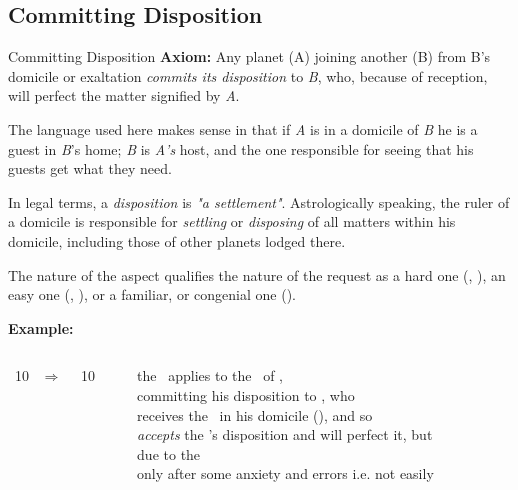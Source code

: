 \subsection{Committing Disposition}
\begin{frame}[t]{Committing Disposition}
\small
\textbf{Axiom:} Any planet (A) joining another (B) from B's domicile or exaltation \textsl{commits its disposition} to \textsl{B}, who, because of reception, will perfect the matter signified by \textsl{A}.

The language used here makes sense in that if \textsl{A} is in a domicile of \textsl{B} he is a guest in \textsl{B}'s home; \textsl{B} is \textsl{A's} host, and the one responsible for seeing that his guests get what they need.

In legal terms, a \textsl{disposition} is  \textsl{"a settlement"}.  Astrologically speaking, the ruler of a domicile is responsible for \textsl{settling} or \textsl{disposing} of all matters within his domicile, including those of other planets lodged there.

The nature of the aspect qualifies the nature of the request as a hard one (\Square, \Opposition), an easy one (\Sextile, \Trine), or a familiar, or congenial one (\Conjunction).

\textbf{Example:}
\begin{columns}[T, onlytextwidth]
\Sun\ 10 \Aries\ $\Rightarrow$ \Square\ \Mars\ 10 \Capricorn

\rule{.1mm}{.27\textheight}

the \Sun\ applies to the \Square\ of \Mars, \\
committing his disposition to \Mars, who  \\
receives the \Sun\ in his domicile (\Aries), and so \\
\textsl{accepts} the \Sun's disposition and will perfect it, but \\
due to the \Square\, \\ 
only after some anxiety and errors i.e. not easily
\end{columns}
\end{frame}